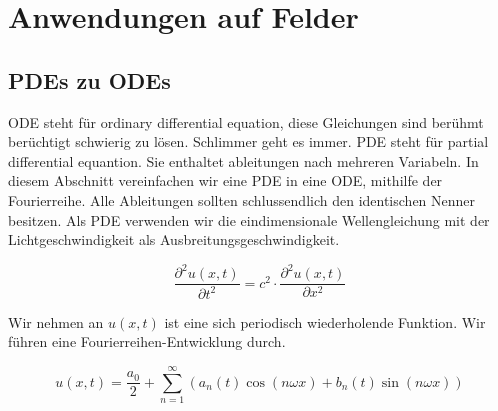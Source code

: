 %
%
%
%



\section{Anwendungen auf Felder\label{fourier:section:teil0}}


\subsection{PDEs zu ODEs\label{fourier:subsection:anwendungenFelder}}


ODE steht für ordinary differential equation, diese Gleichungen sind berühmt berüchtigt schwierig zu lösen.
Schlimmer geht es immer.
PDE steht für partial differential equantion. Sie enthaltet ableitungen nach mehreren Variabeln.
In diesem Abschnitt vereinfachen wir eine PDE in eine ODE, mithilfe der Fourierreihe.
Alle Ableitungen sollten schlussendlich den identischen Nenner besitzen.
Als PDE verwenden wir die eindimensionale Wellengleichung mit der Lichtgeschwindigkeit als Ausbreitungsgeschwindigkeit. 


\begin{equation}
	\frac{\partial^2 u(x, t)}{\partial t^2} = c^2 \cdot \frac{\partial^2 u(x, t)}{\partial x^2}
\end{equation}

Wir nehmen an $u(x, t)$ ist eine sich periodisch wiederholende Funktion. 
Wir führen eine Fourierreihen-Entwicklung durch. 

\begin{equation}
	u(x,t) = \frac{a_0}{2} + \sum_{n=1}^{\infty} \left( a_n(t) \cos(n \omega x) + b_n(t) \sin(n \omega x) \right)
\end{equation}

